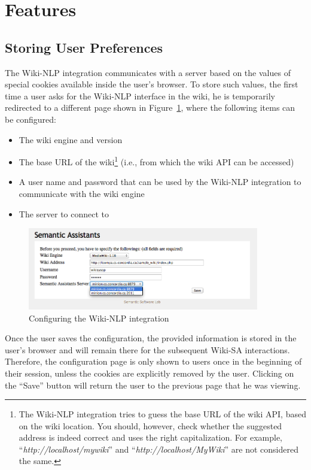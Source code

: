 \section{Features}
\subsection{Storing User Preferences} The Wiki-NLP integration communicates with a \sa server based on the values of special cookies available inside the user's browser. To store such values, the first time a user asks for the Wiki-NLP interface in the wiki, he is temporarily redirected to a different page shown in Figure~\ref{fig:wiki_config}, where the following items can be configured:

\begin{itemize}\itemsep1mm
\item The wiki engine and version
\item The base URL of the wiki\footnote{The Wiki-NLP integration tries to guess the base URL of the wiki API, based on the wiki location. You should, however, check whether the suggested address is indeed correct and uses the right capitalization. For example, ``\emph{http://localhost/mywiki}'' and ``\emph{http://localhost/MyWiki}'' are not considered the same.} (i.e., from which the wiki API can be accessed)
\item A user name and password that can be used by the Wiki-NLP integration to communicate with the wiki engine
\item The \sa server to connect to
\end{itemize}

\begin{figure}[ht]
\centering
\includegraphics[width=0.9\textwidth]{pictures/wiki_config.png}
\caption{Configuring the Wiki-NLP integration}
\label{fig:wiki_config}
\end{figure}

Once the user saves the configuration, the provided information is stored in the user's browser and will remain there for the subsequent Wiki-SA interactions. Therefore, the configuration page is only shown to users once in the beginning of their session, unless the cookies are explicitly removed by the user. Clicking on the ``Save'' button will return the user to the previous page that he was viewing.

